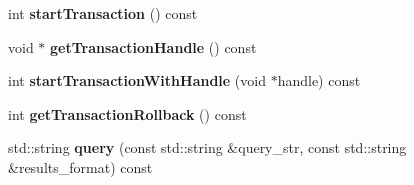 \begin{DoxyCompactItemize}
\item 
\mbox{\label{classomexmeta_1_1RDF_afa2b148ecb235b3ac9497fa3b528d2ed}} 
int {\bfseries start\+Transaction} () const
\item 
\mbox{\label{classomexmeta_1_1RDF_ad30bbe5c9b274713f87d4d4a5f2b28e9}} 
void $\ast$ {\bfseries get\+Transaction\+Handle} () const
\item 
\mbox{\label{classomexmeta_1_1RDF_a278b78d5b1b88397c2eb4143f23dab8b}} 
int {\bfseries start\+Transaction\+With\+Handle} (void $\ast$handle) const
\item 
\mbox{\label{classomexmeta_1_1RDF_af5c7c6104496c09762518d56e94e6048}} 
int {\bfseries get\+Transaction\+Rollback} () const
\item 
\mbox{\label{classomexmeta_1_1RDF_ab168be2c14d53c3fc94024121dc88ba6}} 
std\+::string {\bfseries query} (const std\+::string \&query\+\_\+str, const std\+::string \&results\+\_\+format) const
\end{DoxyCompactItemize}

